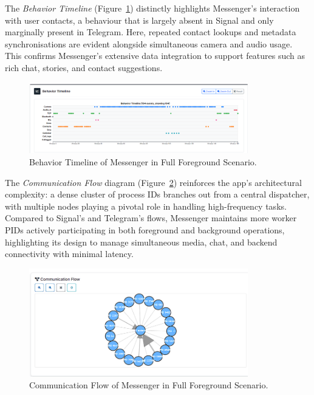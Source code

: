 \documentclass[a4paper,12pt]{report}
\begin{document}
The \textit{Behavior Timeline} (Figure~\ref{fig:messenger-full-behav}) distinctly highlights Messenger’s interaction with user contacts, a behaviour that is largely absent in Signal and only marginally present in Telegram. Here, repeated contact lookups and metadata synchronisations are evident alongside simultaneous camera and audio usage. This confirms Messenger’s extensive data integration to support features such as rich chat, stories, and contact suggestions.

\begin{figure}[H]
    \centering
    \includegraphics[width=0.85\textwidth]{messenger-full-behav.png}
    \caption{Behavior Timeline of Messenger in Full Foreground Scenario.}
    \label{fig:messenger-full-behav}
\end{figure}

The \textit{Communication Flow} diagram (Figure~\ref{fig:messenger-full-flow}) reinforces the app’s architectural complexity: a dense cluster of process IDs branches out from a central dispatcher, with multiple nodes playing a pivotal role in handling high-frequency tasks. Compared to Signal’s and Telegram’s flows, Messenger maintains more worker PIDs actively participating in both foreground and background operations, highlighting its design to manage simultaneous media, chat, and backend connectivity with minimal latency.

\begin{figure}[H]
    \centering
    \includegraphics[width=0.85\textwidth]{messenger-full-flow.png}
    \caption{Communication Flow of Messenger in Full Foreground Scenario.}
    \label{fig:messenger-full-flow}
\end{figure}
\end{document}
